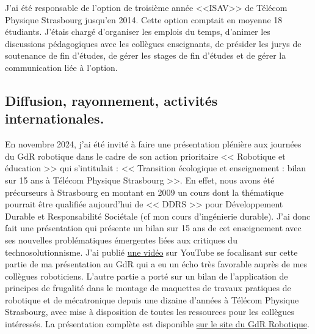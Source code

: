 \documentclass[a4paper,12pt]{article}
\begin{document}
J'ai été responsable de l'option de troisième année <<ISAV>> de Télécom Physique Strasbourg jusqu'en 2014. Cette option comptait en moyenne 18 étudiants. J'étais chargé d'organiser les emplois du temps, d'animer les discussions pédagogiques avec les collègues enseignants, de présider les jurys de soutenance de fin d'études, de gérer les stages de fin d'études et de gérer la communication liée à l'option.

\subsection{Diffusion, rayonnement, activités internationales.}
\label{sec:ens_diffusion_rayonnement}


En novembre 2024, j'ai été invité à faire une présentation plénière aux journées du GdR robotique dans le cadre de son action prioritaire << Robotique et éducation >> qui s'intitulait : << Transition écologique et enseignement : bilan sur 15 ans à Télécom Physique Strasbourg >>. En effet, nous avons été précurseurs à Strasbourg en montant en 2009 un cours dont la thématique pourrait être qualifiée aujourd'hui de << DDRS >> pour Développement Durable et Responsabilité Sociétale (cf mon cours d'ingénierie durable). J'ai donc fait une présentation qui présente un bilan sur 15 ans de cet enseignement avec ses nouvelles problématiques émergentes liées aux critiques du technosolutionnisme. J'ai publié \href{https://youtu.be/gVKNGADG_mw}{une vidéo} sur YouTube se focalisant sur cette partie de ma présentation au GdR qui a eu un écho très favorable auprès de mes collègues roboticiens. L'autre partie a porté sur un bilan de l'application de principes de frugalité dans le montage de maquettes de travaux pratiques de robotique et de mécatronique depuis une dizaine d'années à Télécom Physique Strasbourg, avec mise à disposition de toutes les ressources pour les collègues intéressés. La présentation complète est disponible \href{https://www.gdr-robotique.org/rapports/?id=c93716b1cd6309bde1a84101b5ea847d}{sur le site du GdR Robotique}.
\end{document}
